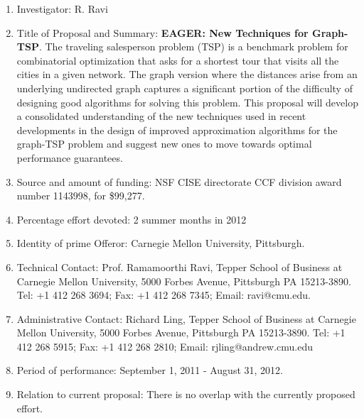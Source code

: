 \begin{enumerate}
\item Investigator: R. Ravi
\item Title of Proposal and Summary: {\bf EAGER: New Techniques for Graph-TSP}. The traveling salesperson problem (TSP) is a benchmark problem for combinatorial optimization that asks for a shortest tour that visits all the cities in a given network. The graph version where the distances arise from an underlying undirected graph captures a significant portion of the difficulty of designing good algorithms for solving this problem. This proposal will develop a consolidated understanding of the new techniques used in recent developments in the design of improved approximation algorithms for the graph-TSP problem and suggest new ones to move towards optimal performance guarantees.
\item Source and amount of funding: NSF CISE directorate CCF division award number 1143998, for \$99,277.
\item Percentage effort devoted: 2 summer months in 2012
\item Identity of prime Offeror: Carnegie Mellon University, Pittsburgh.
\item Technical Contact: Prof. Ramamoorthi Ravi,  Tepper School of Business at
 Carnegie Mellon University,  5000 Forbes Avenue, Pittsburgh PA 15213-3890.  Tel: +1 412 268 3694;  Fax: +1 412 268 7345;  Email: ravi@cmu.edu.
\item Administrative Contact: Richard Ling, Tepper School of Business at
 Carnegie Mellon University,  5000 Forbes Avenue, Pittsburgh PA 15213-3890. Tel: +1 412 268 5915; Fax: +1 412 268 2810; Email: rjling@andrew.cmu.edu
\item  Period of performance: September 1, 2011 - August 31, 2012.
\item Relation to current proposal: There is no overlap with the currently proposed effort.
\end{enumerate}

